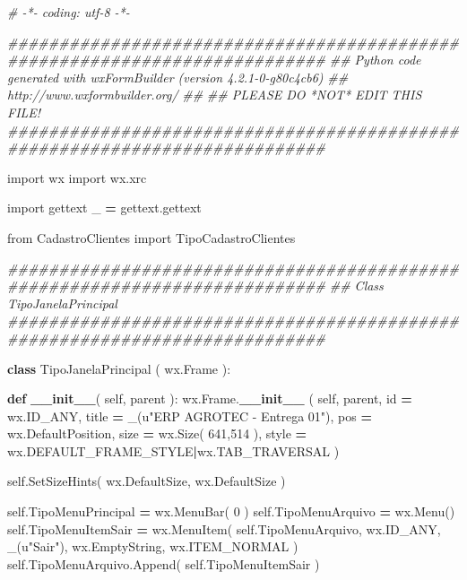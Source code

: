 \documentclass[
]{book}
\newenvironment{Shaded}{\begin{snugshade}}{\end{snugshade}}
\newcommand{\BuiltInTok}[1]{#1}
\newcommand{\CommentTok}[1]{\textcolor[rgb]{0.56,0.35,0.01}{\textit{#1}}}
\newcommand{\DecValTok}[1]{\textcolor[rgb]{0.00,0.00,0.81}{#1}}
\newcommand{\FunctionTok}[1]{\textcolor[rgb]{0.13,0.29,0.53}{\textbf{#1}}}
\newcommand{\ImportTok}[1]{#1}
\newcommand{\KeywordTok}[1]{\textcolor[rgb]{0.13,0.29,0.53}{\textbf{#1}}}
\newcommand{\NormalTok}[1]{#1}
\newcommand{\OperatorTok}[1]{\textcolor[rgb]{0.81,0.36,0.00}{\textbf{#1}}}
\newcommand{\StringTok}[1]{\textcolor[rgb]{0.31,0.60,0.02}{#1}}
\newcommand{\VariableTok}[1]{\textcolor[rgb]{0.00,0.00,0.00}{#1}}
\begin{document}
\begin{Shaded}
\begin{Highlighting}[]

\CommentTok{\# {-}*{-} coding: utf{-}8 {-}*{-}}

\CommentTok{\#\#\#\#\#\#\#\#\#\#\#\#\#\#\#\#\#\#\#\#\#\#\#\#\#\#\#\#\#\#\#\#\#\#\#\#\#\#\#\#\#\#\#\#\#\#\#\#\#\#\#\#\#\#\#\#\#\#\#\#\#\#\#\#\#\#\#\#\#\#\#\#\#\#\#}
\CommentTok{\#\# Python code generated with wxFormBuilder (version 4.2.1{-}0{-}g80c4cb6)}
\CommentTok{\#\# http://www.wxformbuilder.org/}
\CommentTok{\#\#}
\CommentTok{\#\# PLEASE DO *NOT* EDIT THIS FILE!}
\CommentTok{\#\#\#\#\#\#\#\#\#\#\#\#\#\#\#\#\#\#\#\#\#\#\#\#\#\#\#\#\#\#\#\#\#\#\#\#\#\#\#\#\#\#\#\#\#\#\#\#\#\#\#\#\#\#\#\#\#\#\#\#\#\#\#\#\#\#\#\#\#\#\#\#\#\#\#}

\ImportTok{import}\NormalTok{ wx}
\ImportTok{import}\NormalTok{ wx.xrc}

\ImportTok{import}\NormalTok{ gettext}
\NormalTok{\_ }\OperatorTok{=}\NormalTok{ gettext.gettext}


\ImportTok{from}\NormalTok{ CadastroClientes }\ImportTok{import}\NormalTok{ TipoCadastroClientes}

\CommentTok{\#\#\#\#\#\#\#\#\#\#\#\#\#\#\#\#\#\#\#\#\#\#\#\#\#\#\#\#\#\#\#\#\#\#\#\#\#\#\#\#\#\#\#\#\#\#\#\#\#\#\#\#\#\#\#\#\#\#\#\#\#\#\#\#\#\#\#\#\#\#\#\#\#\#\#}
\CommentTok{\#\# Class TipoJanelaPrincipal}
\CommentTok{\#\#\#\#\#\#\#\#\#\#\#\#\#\#\#\#\#\#\#\#\#\#\#\#\#\#\#\#\#\#\#\#\#\#\#\#\#\#\#\#\#\#\#\#\#\#\#\#\#\#\#\#\#\#\#\#\#\#\#\#\#\#\#\#\#\#\#\#\#\#\#\#\#\#\#}

\KeywordTok{class}\NormalTok{ TipoJanelaPrincipal ( wx.Frame ):}

   \KeywordTok{def} \FunctionTok{\_\_init\_\_}\NormalTok{( }\VariableTok{self}\NormalTok{, parent ):}
\NormalTok{       wx.Frame.}\FunctionTok{\_\_init\_\_}\NormalTok{ ( }\VariableTok{self}\NormalTok{, parent, }\BuiltInTok{id} \OperatorTok{=}\NormalTok{ wx.ID\_ANY, title }\OperatorTok{=}\NormalTok{ \_(}\StringTok{u"ERP AGROTEC {-} Entrega 01"}\NormalTok{), pos }\OperatorTok{=}\NormalTok{ wx.DefaultPosition, size }\OperatorTok{=}\NormalTok{ wx.Size( }\DecValTok{641}\NormalTok{,}\DecValTok{514}\NormalTok{ ), style }\OperatorTok{=}\NormalTok{ wx.DEFAULT\_FRAME\_STYLE}\OperatorTok{|}\NormalTok{wx.TAB\_TRAVERSAL )}

       \VariableTok{self}\NormalTok{.SetSizeHints( wx.DefaultSize, wx.DefaultSize )}

       \VariableTok{self}\NormalTok{.TipoMenuPrincipal }\OperatorTok{=}\NormalTok{ wx.MenuBar( }\DecValTok{0}\NormalTok{ )}
       \VariableTok{self}\NormalTok{.TipoMenuArquivo }\OperatorTok{=}\NormalTok{ wx.Menu()}
       \VariableTok{self}\NormalTok{.TipoMenuItemSair }\OperatorTok{=}\NormalTok{ wx.MenuItem( }\VariableTok{self}\NormalTok{.TipoMenuArquivo, wx.ID\_ANY, \_(}\StringTok{u"Sair"}\NormalTok{), wx.EmptyString, wx.ITEM\_NORMAL )}
       \VariableTok{self}\NormalTok{.TipoMenuArquivo.Append( }\VariableTok{self}\NormalTok{.TipoMenuItemSair )}


\end{Highlighting}
\end{Shaded}
\end{document}
